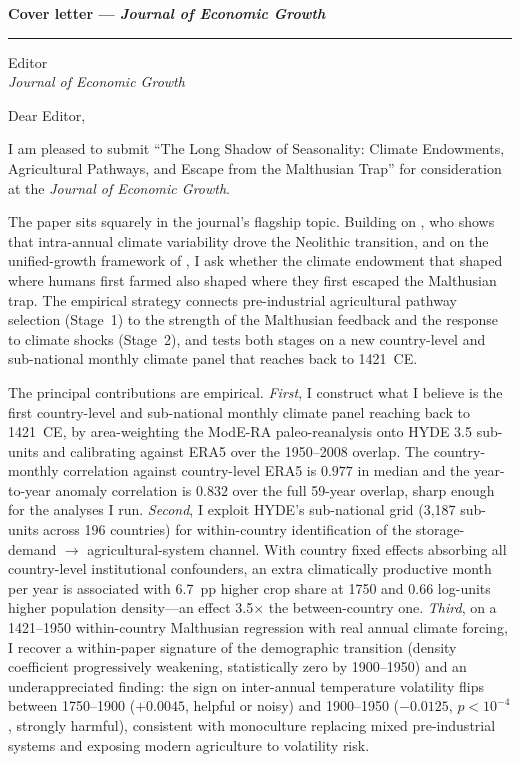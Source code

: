 \documentclass[11pt,letterpaper]{article}
\begin{document}
\noindent\textbf{Cover letter --- \emph{Journal of Economic Growth}}\\[0.4em]
\textcolor{mutedgray}{\rule{0.22\linewidth}{0.4pt}}

\bigskip
\noindent Editor\\
\textit{Journal of Economic Growth}

\bigskip

\noindent Dear Editor,

\bigskip

\noindent I am pleased to submit ``The Long Shadow of Seasonality: Climate Endowments, Agricultural Pathways, and Escape from the Malthusian Trap'' for consideration at the \emph{Journal of Economic Growth}.

The paper sits squarely in the journal's flagship topic. Building on \citet{matranga2024}, who shows that intra-annual climate variability drove the Neolithic transition, and on the unified-growth framework of \citet{galor2011unified}, I ask whether the climate endowment that shaped where humans first farmed also shaped where they first escaped the Malthusian trap. The empirical strategy connects pre-industrial agricultural pathway selection (Stage~1) to the strength of the Malthusian feedback and the response to climate shocks (Stage~2), and tests both stages on a new country-level and sub-national monthly climate panel that reaches back to 1421~CE.

The principal contributions are empirical. \emph{First}, I construct what I believe is the first country-level and sub-national monthly climate panel reaching back to 1421~CE, by area-weighting the ModE-RA paleo-reanalysis onto HYDE 3.5 sub-units and calibrating against ERA5 over the 1950--2008 overlap. The country-monthly correlation against country-level ERA5 is $0.977$ in median and the year-to-year anomaly correlation is $0.832$ over the full 59-year overlap, sharp enough for the analyses I run. \emph{Second}, I exploit HYDE's sub-national grid (3{,}187 sub-units across 196 countries) for within-country identification of the storage-demand $\to$ agricultural-system channel. With country fixed effects absorbing all country-level institutional confounders, an extra climatically productive month per year is associated with 6.7~pp higher crop share at 1750 and 0.66 log-units higher population density---an effect 3.5$\times$ the between-country one. \emph{Third}, on a 1421--1950 within-country Malthusian regression with real annual climate forcing, I recover a within-paper signature of the demographic transition (density coefficient progressively weakening, statistically zero by 1900--1950) and an underappreciated finding: the sign on inter-annual temperature volatility flips between 1750--1900 ($+0.0045$, helpful or noisy) and 1900--1950 ($-0.0125$, $p < 10^{-4}$, strongly harmful), consistent with monoculture replacing mixed pre-industrial systems and exposing modern agriculture to volatility risk.
\end{document}
